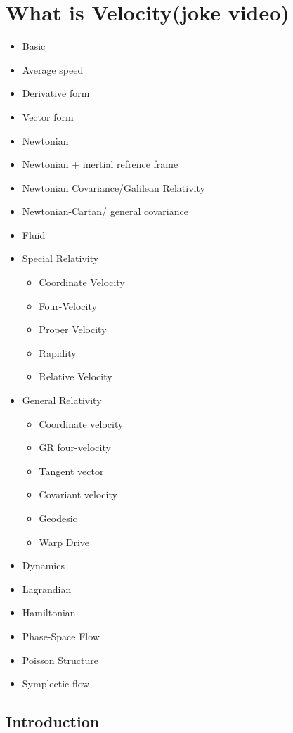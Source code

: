 \section{What is Velocity(joke video)}
\begin{itemize}
	\item Basic
	\item Average speed
	\item Derivative form
	\item Vector form
	\item Newtonian
	\item Newtonian + inertial refrence frame
	\item Newtonian Covariance/Galilean Relativity
	\item Newtonian-Cartan/ general covariance
	\item Fluid
	\item Special Relativity
	      \begin{itemize}
		      \item Coordinate Velocity
		      \item Four-Velocity
		      \item Proper Velocity
		      \item Rapidity
		      \item Relative Velocity
	      \end{itemize}
	\item General Relativity
	      \begin{itemize}
		      \item Coordinate velocity
		      \item GR four-velocity
		      \item Tangent vector
		      \item Covariant velocity
		      \item Geodesic
		      \item Warp Drive
	      \end{itemize}
	\item Dynamics
	\item Lagrandian
	\item Hamiltonian
	\item Phase-Space Flow
	\item Poisson Structure
	\item Symplectic flow
\end{itemize}


\subsection{Introduction}

